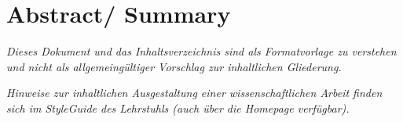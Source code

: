 %
%
\section*{Abstract/ Summary}

\textit{Dieses Dokument und das Inhaltsverzeichnis sind als Formatvorlage zu verstehen und nicht als allgemeingültiger Vorschlag zur inhaltlichen Gliederung.}

\textit{Hinweise zur inhaltlichen Ausgestaltung einer wissenschaftlichen Arbeit finden sich im StyleGuide des Lehrstuhls (auch über die Homepage verfügbar).}
